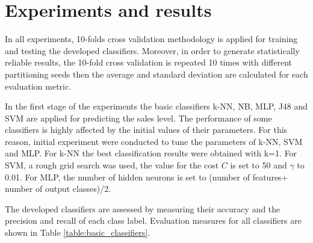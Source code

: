 \documentclass[a4paper,10pt,onecolumn,preprint,3p]{elsarticle}
\begin{document}
\section{Experiments and results}
\label{sec:experiments_results}


In all experiments, 10-folds cross validation methodology is applied for training and testing the developed classifiers. Moreover, in order to generate statistically reliable results, the 10-fold cross validation is repeated 10 times with different partitioning seeds then the average and standard deviation are calculated for each evaluation metric.

In the first stage of the experiments the basic classifiers k-NN, NB, MLP, J48 and SVM are applied for predicting the sales level. The performance of some classifiers is highly affected by the initial values of their parameters. For this reason, initial experiment were conducted to tune the parameters of k-NN, SVM and MLP. For k-NN the best classification results were obtained with k=1. For SVM, a rough grid search was used, the value for the cost $C$ is set to 50 and $\gamma$  to 0.01. For MLP, the number of hidden neurons is set to (number of features+ number of output classes)/2.


The developed classifiers are assessed by measuring their accuracy and the precision and recall of each class label. Evaluation measures for all classifiers are shown in Table \ref{table:basic_classifiers}. 
\end{document}
